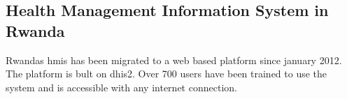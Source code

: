 %

\cite{moh:rw}
\subsection{Health Management Information System in Rwanda}
Rwandas \gls{hmis} has been migrated to a web based platform since january 2012.
The platform is bult on \gls{dhis2}.
Over 700 users have been trained to use the system and is accessible with any internet connection. 
\cite{moh:rw}
